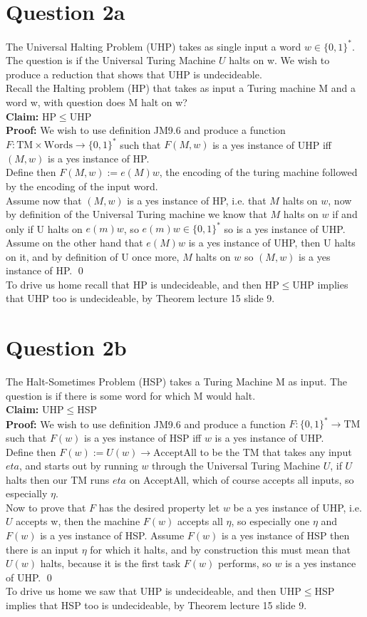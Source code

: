 \documentclass{article}
\theoremstyle{remark}
\numberwithin{equation}{section}
\begin{document}
\section{Question 2a}
The Universal Halting Problem (UHP) takes as single input a word $w \in\{0, 1\}^*$. The question is if the Universal Turing Machine $U$ halts on w. We wish to produce a reduction that shows that UHP is undecideable.\\
Recall the Halting problem (HP) that takes as input a Turing machine M and a word w, with question does M halt on w?\\
\textbf{Claim:} HP$\leq$UHP\\
\textbf{Proof:} We wish to use definition JM9.6 and produce a function $F:\text{TM}\times\text{Words}\rightarrow\{0,1\}^*$ such that $F(M,w)$ is a yes instance of UHP iff $(M,w)$ is a yes instance of HP.\\
Define then $F(M,w):=e(M)w$, the encoding of the turing machine followed by the encoding of the input word.\\
Assume now that $(M,w)$ is a yes instance of HP, i.e. that $M$ halts on $w$, now by definition of the Universal Turing machine we know that $M$ halts on $w$ if and only if U halts on $e(m)w$, so $e(m)w\in\{0,1\}^*$ so is a yes instance of UHP.\\
Assume on the other hand that $e(M)w$ is a yes instance of UHP, then U halts on it, and by definition of U once more, $M$ halts on $w$ so $(M,w)$ is a yes instance of HP. \qed\\
To drive us home recall that HP is undecideable, and then HP$\leq$UHP implies that UHP too is undecideable, by Theorem lecture 15 slide 9.
\section{Question 2b}
The Halt-Sometimes Problem (HSP) takes a Turing Machine M as input. The question is if there is some word for which M would halt.\\
\textbf{Claim:} UHP$\leq$HSP\\
\textbf{Proof:} We wish to use definition JM9.6 and produce a function $F:\{0,1\}^* \rightarrow \text{TM}$ such that $F(w)$ is a yes instance of HSP iff $w$ is a yes instance of UHP.\\
Define then $F(w):=U(w)\rightarrow\text{AcceptAll}$ to be the TM that takes any input $eta$, and starts out by running $w$ through the Universal Turing Machine $U$, if $U$ halts then our TM runs $eta$ on AcceptAll, which of course accepts all inputs, so especially $\eta$.\\
Now to prove that $F$ has the desired property let $w$ be a yes instance of UHP, i.e. $U$ accepts w, then the machine $F(w)$ accepts all $\eta$, so especially one $\eta$ and $F(w)$ is a yes instance of HSP. Assume $F(w)$ is a yes instance of HSP then there is an input $\eta$ for which it halts, and by construction this must mean that $U(w)$ halts, because it is the first task $F(w)$ performs, so $w$ is a yes instance of UHP. \qed
\\To drive us home we saw that UHP is undecideable, and then UHP$\leq$HSP implies that HSP too is undecideable, by Theorem lecture 15 slide 9. \newpage
\end{document}
